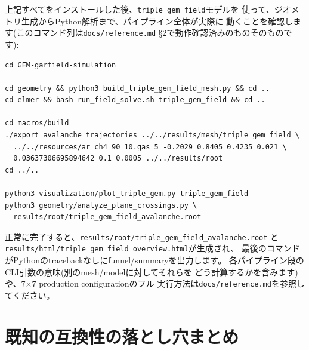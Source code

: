\documentclass[11pt]{ltjsarticle}
\begin{document}
上記すべてをインストールした後、\texttt{triple\_gem\_field}モデルを
使って、ジオメトリ生成からPython解析まで、パイプライン全体が実際に
動くことを確認します(このコマンド列は\texttt{docs/reference.md}
\S2で動作確認済みのものそのものです):

\begin{lstlisting}
cd GEM-garfield-simulation

cd geometry && python3 build_triple_gem_field_mesh.py && cd ..
cd elmer && bash run_field_solve.sh triple_gem_field && cd ..

cd macros/build
./export_avalanche_trajectories ../../results/mesh/triple_gem_field \
  ../../resources/ar_ch4_90_10.gas 5 -0.2029 0.8405 0.4235 0.021 \
  0.03637306695894642 0.1 0.0005 ../../results/root
cd ../..

python3 visualization/plot_triple_gem.py triple_gem_field
python3 geometry/analyze_plane_crossings.py \
  results/root/triple_gem_field_avalanche.root
\end{lstlisting}

正常に完了すると、\texttt{results/root/triple\_gem\_field\_avalanche.root}
と\texttt{results/html/triple\_gem\_field\_overview.html}が生成され、
最後のコマンドがPythonのtracebackなしにfunnel/summaryを出力します。
各パイプライン段のCLI引数の意味(別のmesh/modelに対してそれらを
どう計算するかを含みます)や、7×7 production configurationのフル
実行方法は\texttt{docs/reference.md}を参照してください。

\section{既知の互換性の落とし穴まとめ}
\end{document}
